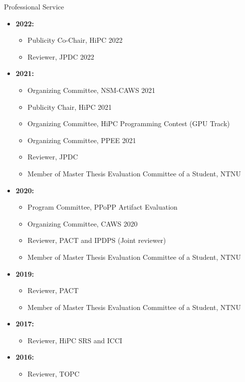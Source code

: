 \documentclass{resume} %
\begin{document}
\begin{rSection}{Professional Service}
\begin{itemize}
	\item \textbf{2022:}
	\begin{itemize}		
		\item Publicity Co-Chair, HiPC 2022
		\item Reviewer, JPDC 2022
	\end{itemize}
	\item \textbf{2021:}
	\begin{itemize}
		\item Organizing Committee, NSM-CAWS 2021		
		\item Publicity Chair, HiPC 2021
		\item Organizing Committee, HiPC Programming Contest (GPU Track)
		\item Organizing Committee, PPEE 2021
		\item Reviewer, JPDC
		\item Member of Master Thesis Evaluation Committee of a Student, NTNU
	\end{itemize}
	\item \textbf{2020:}
	\begin{itemize}
		\item Program Committee, PPoPP Artifact Evaluation
		\item Organizing Committee, CAWS 2020
		\item Reviewer, PACT and IPDPS (Joint reviewer)
		\item Member of Master Thesis Evaluation Committee of a Student, NTNU
	\end{itemize}
	\item  \textbf{2019:}
	\begin{itemize}
		\item Reviewer, PACT
		\item Member of Master Thesis Evaluation Committee of a Student, NTNU
	\end{itemize}
	\item  \textbf{2017:}
	\begin{itemize}
		\item Reviewer, HiPC SRS and ICCI
	\end{itemize}
	\item  \textbf{2016:}
	\begin{itemize}
		\item Reviewer, TOPC
	\end{itemize}
\end{itemize}
\end{rSection}
\end{document}
